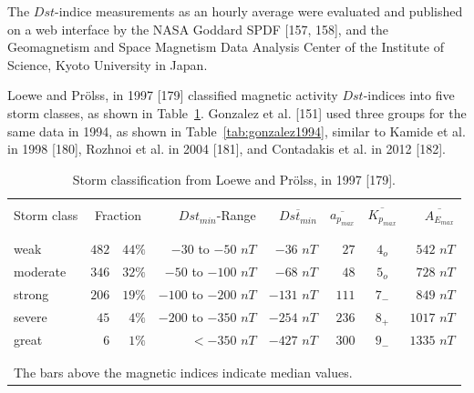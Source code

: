 \documentclass[sn-mathphys-num]{sn-jnl}%
\begin{document}
The $Dst$-indice measurements as an hourly average were evaluated and published on a web interface by the NASA Goddard SPDF [157, 158], and the Geomagnetism and Space Magnetism Data Analysis Center of the Institute of Science, Kyoto University in Japan.

Loewe and Prölss, in 1997 [179] classified magnetic activity $Dst$-indices into five storm classes, as shown in Table~\ref{tab:loewe1997}. Gonzalez et al. [151] used three groups for the same data in 1994, as shown in Table~\ref{tab:gonzalez1994}, similar to Kamide et al. in 1998 [180], Rozhnoi et al. in 2004 [181], and Contadakis et al. in 2012 [182].

\begin{table}[!ht]
    \centering
    \caption{Storm classification from Loewe and Prölss, in 1997 [179].}
    \label{tab:loewe1997}
    \begin{tabular}{lrrrrrcr}
        \hline
        \\
        Storm class & \multicolumn{2}{c}{Fraction} & $Dst_{min}$-Range & $\overline{Dst_{min}}$ & $\overline{a_{p_{max}}}$ & $\overline{K_{p_{max}}}$ & $\overline{A_{E_{max}}}$ \\
        \\
        \hline
        \\
        weak & $482$ & $44\%$ & $-30$ to $-50$ $nT$ & $-36$ $nT$ & $27$ & $4_{o}$ & $542$ $nT$ \\
        moderate & $346$ & $32\%$ & $-50$ to $-100$ $nT$ & $-68$ $nT$ & $48$ & $5_{o}$ & $728$ $nT$ \\
        strong & $206$ & $19\%$ & $-100$ to $-200$ $nT$ & $-131$ $nT$ & $111$ & $7_{-}$ & $849$ $nT$ \\
        severe & $45$ & $4\%$ & $-200$ to $-350$ $nT$ & $-254$ $nT$ & $236$ & $8_{+}$ & $1017$ $nT$ \\
        great & $6$ & $1\%$ & $<-350$ $nT$ & $-427$ $nT$ & $300$ & $9_{-}$ & $1335$ $nT$ \\
        \\
        \hline
        \\
        \multicolumn{8}{l}{The bars above the magnetic indices indicate median values.} \\
    \end{tabular}
\end{table}
\end{document}
